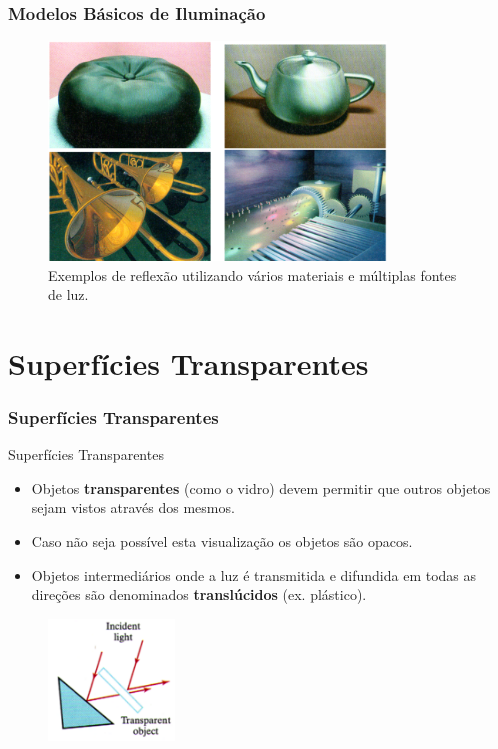 \documentclass{beamer}
\begin{document}
\begin{frame}
\frametitle{Modelos Básicos de Iluminação}
		\begin{figure}[!h]
		\begin{center}
		\includegraphics[width=0.8\textwidth]{Figures/MulMatLig}
		\caption{Exemplos de reflexão utilizando vários materiais e múltiplas fontes de luz.}
		\end{center}
	\end{figure}	
\end{frame}


\section{Superfícies Transparentes}
\begin{frame}
\frametitle{Superfícies Transparentes}

	\begin{block}{Superfícies Transparentes}
		\begin{itemize}
			\item Objetos \textbf{transparentes} (como o vidro) devem permitir que outros objetos sejam vistos através dos mesmos.
			\item Caso não seja possível esta visualização os objetos são opacos.
			\item Objetos intermediários onde a luz é transmitida e difundida em todas as direções são denominados \textbf{translúcidos} (ex. plástico).
		\end{itemize}
	\end{block}
	
	\begin{figure}[!h]
		\begin{center}
		\includegraphics[width=0.3\textwidth]{Figures/ObjTra}
		\end{center}
	\end{figure}	
\end{frame}
\end{document}
